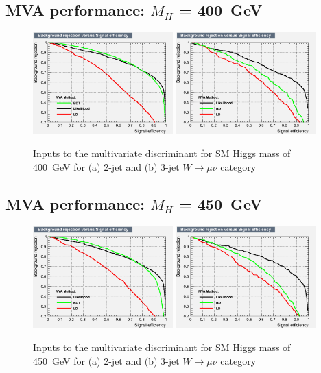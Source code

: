 \subsection{MVA performance: \texorpdfstring{$M_H$}{M(H)} = 400~GeV}
\begin{figure}[ht]
  \centering
  \includegraphics[width=0.48\textwidth]{figs/TMVA_400_nJ2_mu_rejBvsS}
  \includegraphics[width=0.48\textwidth]{figs/TMVA_400_nJ3_mu_rejBvsS}	
  \caption{\label{fig:perf400mu}Inputs to the multivariate discriminant for SM Higgs mass of 400~GeV for (a) 2-jet and (b) 3-jet $W\to\mu\nu$ category}
\end{figure}
\newpage
\subsection{MVA performance: \texorpdfstring{$M_H$}{M(H)} = 450~GeV}
\begin{figure}[ht]
  \centering
  \includegraphics[width=0.48\textwidth]{figs/TMVA_450_nJ2_mu_rejBvsS}
  \includegraphics[width=0.48\textwidth]{figs/TMVA_450_nJ3_mu_rejBvsS}	
  \caption{\label{fig:perf450mu}Inputs to the multivariate discriminant for SM Higgs mass of 450~GeV for (a) 2-jet and (b) 3-jet $W\to\mu\nu$ category}
\end{figure}
